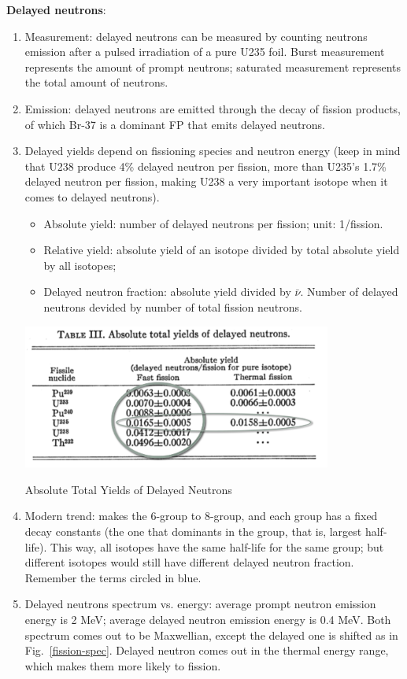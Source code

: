 \documentclass{school-22.211-notes}
\begin{document}
\textbf{Delayed neutrons}:
\begin{enumerate}
\item Measurement: delayed neutrons can be measured by counting neutrons emission after a pulsed irradiation of a pure U235 foil. Burst measurement represents the amount of prompt neutrons; saturated measurement represents the total amount of neutrons. 
\item Emission: delayed neutrons are emitted through the decay of fission products, of which Br-37 is a dominant FP that emits delayed neutrons. 
\item Delayed yields depend on fissioning species and neutron energy (keep in mind that U238 produce 4\% delayed neutron per fission, more than U235's 1.7\% delayed neutron per fission, making U238 a very important isotope when it comes to delayed neutrons). 
  \begin{itemize}
  \item Absolute yield: number of delayed neutrons per fission; unit: 1/fission. 
  \item Relative yield: absolute yield of an isotope divided by total absolute yield by all isotopes; 
  \item Delayed neutron fraction: absolute yield divided by $\bar{\nu}$. Number of delayed neutrons devided by number of total fission neutrons. 
  \end{itemize}
  \begin{table}[ht]
    \centering
    \includegraphics[width=4in]{images/pke/abs-yield.png}
    \caption{Absolute Total Yields of Delayed Neutrons} \label{abs-yield} 
  \end{table}
\item Modern trend: makes the 6-group to 8-group, and each group has a fixed decay constants (the one that dominants in the group, that is, largest half-life). This way, all isotopes have the same half-life for the same group; but different isotopes would still have different delayed neutron fraction. Remember the terms circled in blue.  
\item Delayed neutrons spectrum vs. energy: average prompt neutron emission energy is 2 MeV; average delayed neutron emission energy is 0.4 MeV. Both spectrum comes out to be Maxwellian, except the delayed one is shifted as in Fig.~\ref{fission-spec}. Delayed neutron comes out in the thermal energy range, which makes them more likely to fission. 

\end{enumerate}
\end{document}
